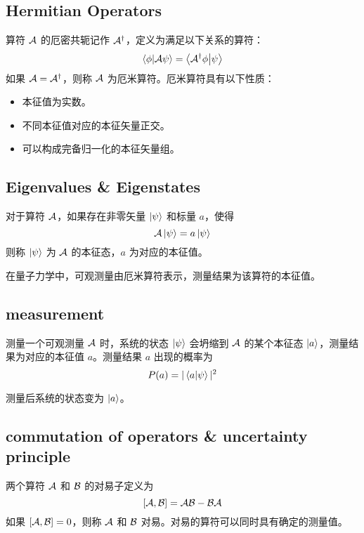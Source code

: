 \subsection{Hermitian Operators}
算符 $\mathcal{A}$ 的厄密共轭记作 $\mathcal{A}^\dagger$，定义为满足以下关系的算符：
\begin{equation}
    \left<\phi\middle|\mathcal{A}\psi\right> = \left<\mathcal{A}^\dagger\phi\middle|\psi\right>
\end{equation}
如果 $\mathcal{A} = \mathcal{A}^\dagger$，则称 $\mathcal{A}$ 为厄米算符。厄米算符具有以下性质：
\begin{itemize}
    \item 本征值为实数。
    \item 不同本征值对应的本征矢量正交。
    \item 可以构成完备归一化的本征矢量组。
\end{itemize}

\subsection{Eigenvalues \& Eigenstates}
对于算符 $\mathcal{A}$，如果存在非零矢量 $\left|\psi\right>$ 和标量 $a$，使得
\begin{equation}
    \mathcal{A}\left|\psi\right> = a\left|\psi\right>
\end{equation}
则称 $\left|\psi\right>$ 为 $\mathcal{A}$ 的本征态，$a$ 为对应的本征值。

在量子力学中，可观测量由厄米算符表示，测量结果为该算符的本征值。

\subsection{measurement}
测量一个可观测量 $\mathcal{A}$ 时，系统的状态 $\left|\psi\right>$ 会坍缩到 $\mathcal{A}$ 的某个本征态 $\left|a\right>$，测量结果为对应的本征值 $a$。测量结果 $a$ 出现的概率为
\begin{equation}
    P(a) = |\left<a\middle|\psi\right>|^2
\end{equation}

测量后系统的状态变为 $\left|a\right>$。

\subsection{commutation of operators \& uncertainty principle}
两个算符 $\mathcal{A}$ 和 $\mathcal{B}$ 的对易子定义为
\begin{equation}
    \left[\mathcal{A},\mathcal{B}\right] = \mathcal{A}\mathcal{B} - \mathcal{B}\mathcal{A}
\end{equation}
如果 $\left[\mathcal{A},\mathcal{B}\right] = 0$，则称 $\mathcal{A}$ 和 $\mathcal{B}$ 对易。对易的算符可以同时具有确定的测量值。

